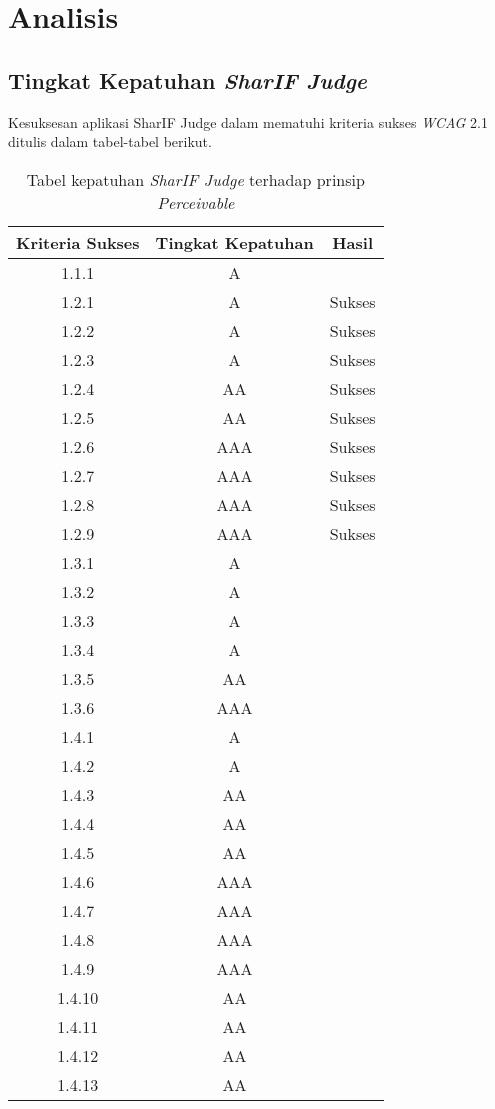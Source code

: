 \chapter{Analisis}
\label{chap:analisis}

\section{Tingkat Kepatuhan \textit{SharIF Judge}}
\label{sec:kepatuhan_sharif_judge_terhadap_wcag_2.1}
Kesuksesan aplikasi SharIF Judge dalam mematuhi kriteria sukses \textit{WCAG} 2.1 ditulis dalam tabel-tabel berikut.

\begin{table}[H]
	\centering
	\caption{Tabel kepatuhan \textit{SharIF Judge} terhadap prinsip \textit{Perceivable}}
	\label{tab:kepatuhan_sharif_judge_perceivable}
	\begin{tabular}{|c|c|c|}
		\hline
		Kriteria Sukses & Tingkat Kepatuhan & Hasil \\
		\hline
		1.1.1 & A &  \\
		1.2.1 & A & Sukses \\
		1.2.2 & A & Sukses \\
		1.2.3 & A & Sukses \\
		1.2.4 & AA & Sukses \\
		1.2.5 & AA & Sukses \\
		1.2.6 & AAA & Sukses \\
		1.2.7 & AAA & Sukses \\
		1.2.8 & AAA & Sukses \\
		1.2.9 & AAA & Sukses \\
		1.3.1 & A &  \\
		1.3.2 & A &  \\
		1.3.3 & A &  \\
		1.3.4 & A &  \\
		1.3.5 & AA &  \\
		1.3.6 & AAA &  \\
		1.4.1 & A & \\
		1.4.2 & A & \\
		1.4.3 & AA & \\
		1.4.4 & AA & \\
		1.4.5 & AA & \\
		1.4.6 & AAA & \\
		1.4.7 & AAA & \\
		1.4.8 & AAA & \\
		1.4.9 & AAA & \\
		1.4.10 & AA & \\
		1.4.11 & AA & \\
		1.4.12 & AA & \\
		1.4.13 & AA & \\
		\hline
	\end{tabular}
\end{table}

